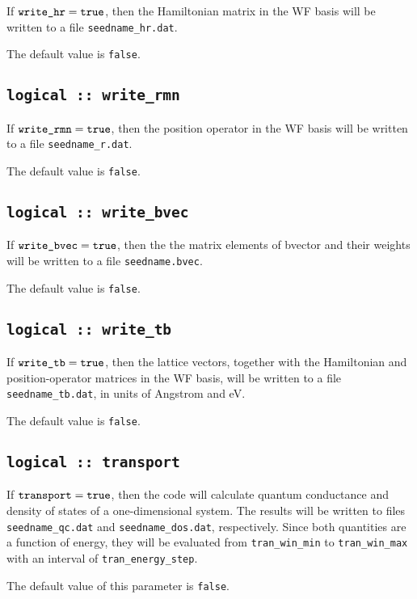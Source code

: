 If $\verb#write_hr#=\verb#true#$, then the Hamiltonian matrix in the
WF basis will be written to a file {\tt seedname\_hr.dat}.

The default value is {\tt false}.

\subsection[write\_rmn]{\tt logical :: write\_rmn}

If $\verb#write_rmn#=\verb#true#$, then the position operator in the
WF basis will be written to a file {\tt seedname\_r.dat}.

The default value is {\tt false}.

\subsection[write\_bvec]{\tt logical :: write\_bvec}

If $\verb#write_bvec#=\verb#true#$, then the the matrix elements of 
bvector and their weights will be written to a file {\tt seedname.bvec}.

The default value is {\tt false}.


\subsection[write\_tb]{\tt logical :: write\_tb}

If $\verb#write_tb#=\verb#true#$, then the lattice vectors, together
with the Hamiltonian and position-operator matrices in the WF basis,
will be written to a file {\tt seedname\_tb.dat}, in units
of Angstrom and eV.

The default value is {\tt false}.


\subsection[transport]{\tt logical :: transport}

If $\verb#transport#=\verb#true#$, then the code will calculate
quantum conductance and density of states of a one-dimensional system.
The results will be written to files \verb#seedname_qc.dat#
and \verb#seedname_dos.dat#, respectively.
Since both quantities are a function of energy,
they will be evaluated from \verb#tran_win_min# to \verb#tran_win_max#
with an interval of \verb#tran_energy_step#.

The default value of this parameter is \verb#false#.

